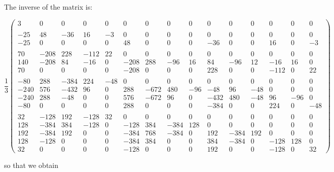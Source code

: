 The inverse of the matrix is:
\begin{scriptsize}
\[
\frac13 
\left(
\begin{array}{lllllllllllllll}
3 & 0& 0 &  0 &  0 &  0 &  0 & 0 & 0 &0 &  0 &  0 & 0 &  0  &  0 \\ \\
-25&   48&  -36&   16&   -3&   0&    0&    0&    0&   0& 0&  0& 0& 0& 0\\
-25& 0& 0& 0& 0&   48&    0&    0&    0&  -36& 0& 0& 16& 0&   -3\\ \\
70& -208&  228& -112&   22&    0&0&0&0&0&0&0&0& 0& 0\\
140& -208&   84&  -16& 0& -208& 288&  -96& 16& 84& -96& 12& -16&16&   0\\
70&   0&   0&   0&   0& -208&   0&   0&   0&  228&   0&0& -112& 0&  22\\ \\
-80&  288& -384&  224&  -48&    0&    0&    0&  0&  0& 0& 0& 0& 0&  0\\
-240&  576& -432& 96& 0& 288& -672& 480& -96& -48& 96&  -48& 0& 0& 0\\
-240&  288& -48& 0& 0&  576& -672& 96& 0& -432& 480& -48& 96&  -96& 0\\ 
-80& 0&  0&  0 &   0&  288&    0&    0&    0& -384& 0&  0& 224& 0& -48\\ \\
32& -128&  192& -128&   32&   0&  0&   0&   0& 0&   0&  0& 0&  0& 0\\
128& -384 & 384 &-128&   0& -128&  384& -384&  128& 0& 0&  0& 0& 0&  0\\
192& -384&  192&  0&   0& -384&  768& -384&  0&  192& -384&  192& 0& 0& 0\\
128& -128  &0&  0&    0& -384&  384&   0&   0&  384& -384&   0&
  -128&  128&   0\\
32& 0&  0&   0& 0& -128&  0& 0& 0&  192& 0&  0& -128& 0&   32
\end{array}
\right)
\]
\end{scriptsize}
so that we obtain
